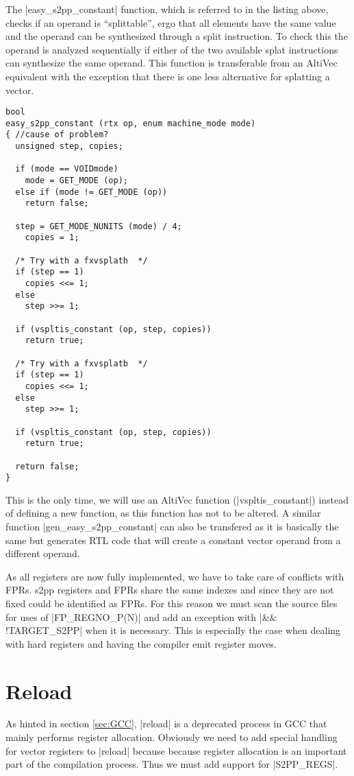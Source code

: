 The |easy_s2pp_constant| function, which is referred to in the listing above, checks if an operand is ``splittable'', ergo that all elements have the same value and the operand can be synthesized through a split instruction.
To check this the operand is analyzed sequentially if either of the two available splat instructions can synthesize the same operand.
This function is transferable from an AltiVec equivalent with the exception that there is one less alternative for splatting a vector.
\begin{lstlisting}
bool
easy_s2pp_constant (rtx op, enum machine_mode mode)
{ //cause of problem?
  unsigned step, copies;

  if (mode == VOIDmode)
    mode = GET_MODE (op);
  else if (mode != GET_MODE (op))
    return false;

  step = GET_MODE_NUNITS (mode) / 4;
    copies = 1;

  /* Try with a fxvsplath  */
  if (step == 1)
    copies <<= 1;
  else
    step >>= 1;

  if (vspltis_constant (op, step, copies))
    return true;

  /* Try with a fxvsplatb  */
  if (step == 1)
    copies <<= 1;
  else
    step >>= 1;

  if (vspltis_constant (op, step, copies))
    return true;

  return false;
}
\end{lstlisting}

This is the only time, we will use an AltiVec function (|vspltis_constant|) instead of defining a new function, as this function has not to be altered.
A similar function |gen_easy_s2pp_constant| can also be transfered as it is basically the same but generates RTL code that will create a constant vector operand from a different operand.

As all registers are now fully implemented, we have to take care of conflicts with FPRs.
s2pp registers and FPRs share the same indexes and since they are not fixed could be identified as FPRs.
For this reason we must scan the source files for uses of |FP_REGNO_P(N)| and add an exception with |&& !TARGET_S2PP| when it is necessary.
This is especially the case when dealing with hard registers and having the compiler emit register moves.

\section{Reload}
As hinted in section \ref{sec:GCC}, |reload| is a deprecated process in GCC that mainly performs register allocation.
Obviously we need to add special handling for vector registers to |reload| because because register allocation is an important part of the compilation process.
Thus we must add support for |S2PP_REGS|.

